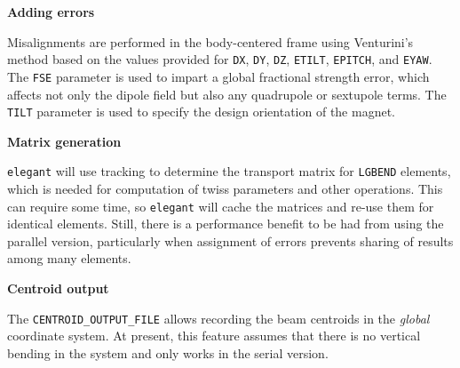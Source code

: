 {\bf Adding errors}

Misalignments are performed in the body-centered frame using Venturini's method \cite{Venturini2021}
based on the values provided for \verb|DX|, \verb|DY|, \verb|DZ|, \verb|ETILT|, \verb|EPITCH|, 
and \verb|EYAW|.
The \verb|FSE| parameter is used to impart a global fractional strength error, which affects not only
the dipole field but also any quadrupole or sextupole terms.
The \verb|TILT| parameter is used to specify the design orientation of the magnet.

{\bf Matrix generation}

{\tt elegant} will use tracking to determine the transport matrix for \verb|LGBEND| elements, which 
is needed for computation of twiss parameters and other operations.
This can require some time, so {\tt elegant} will cache the matrices and re-use them for
identical elements.
Still, there is a performance benefit to be had from using the parallel version, particularly
when assignment of errors prevents sharing of results among many elements.

{\bf Centroid output}

The \verb|CENTROID_OUTPUT_FILE| allows recording the beam centroids in the {\em global} coordinate
system. At present, this feature assumes that there is no vertical bending in the system and
only works in the serial version.
